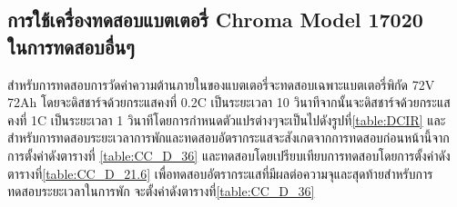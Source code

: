 \subsection{การใช้เครื่องทดสอบแบตเตอรี่ Chroma Model 17020 \\ ในการทดสอบอื่นๆ}
สำหรับการทดสอบการวัดค่าความต้านภายในของแบตเตอรี่จะทดสอบเฉพาะแบตเตอรี่พิกัด 72V 72Ah โดยจะดิสชาร์จด้วยกระแสคงที่ 0.2C เป็นระยะเวลา 10 วินาทีจากนั้นจะดิสชาร์จด้วยกระแสคงที่ 
1C เป็นระยะเวลา 1 วินาทีโดยการกำหนดตัวแปรต่างๆจะเป็นไปดังรูปที่\ref{table:DCIR} และสำหรับการทดสอบระยะเวลาการพักและทดสอบอัตรากระแสจะสังเกตจากการทดสอบก่อนหน้านี้จากการตั้งค่าดังตารางที่
\ref{table:CC_D_36} และทดสอบโดยเปรียบเทียบการทดสอบโดยการตั้งค่าดังตารางที่\ref{table:CC_D_21.6} เพื่อทดสอบอัตรากระแสที่มีผลต่อความจุและสุดท้ายสำหรับการทดสอบระยะเวลาในการพัก
จะตั้งค่าดังตารางที่\ref{table:CC_D_36}
\begin{center}


\begin{table}[]
\centering
\caption{การตั้งค่าสำหรับการทดสอบวัดค่าความต้านทานภายในของแบตเตอรี่ 72V72Ah}
\label{table:DCIR}
\end{table}


\end{center}

